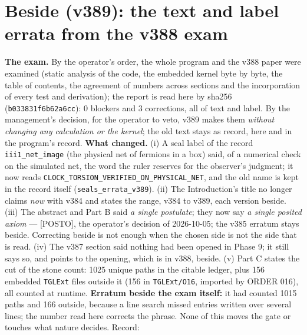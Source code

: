 \documentclass[11pt]{article}
\theoremstyle{definition}\newtheorem{deriv}{Derivation}
\begin{document}
\section*{Beside (v389): the text and label errata from the v388 exam}


\textbf{The exam.} By the operator's order, the whole program and the v388 paper were examined (static analysis of the code, the embedded kernel byte by byte, the table of contents, the agreement of numbers across sections and the incorporation of every test and derivation); the report is read here by sha256 (\texttt{b033831f6b62a6cc}): 0 blockers and 3 corrections, all of text and label. By the management's decision, for the operator to veto, v389 makes them \emph{without changing any calculation or the kernel}; the old text stays as record, here and in the program's record. \textbf{What changed.} (i) A seal label of the record \texttt{iii1\_net\_image} (the physical net of fermions in a box) said, of a numerical check on the simulated net, the word the ruler reserves for the observer's judgment; it now reads \texttt{CLOCK\_\allowbreak{}TORSION\_\allowbreak{}VERIFIED\_\allowbreak{}ON\_\allowbreak{}PHYSICAL\_\allowbreak{}NET}, and the old name is kept in the record itself (\texttt{seals\_errata\_v389}). (ii) The Introduction's title no longer claims \emph{now} with v384 and states the range, v384 to v389, each version beside. (iii) The abstract and Part B said \emph{a single postulate}; they now say \emph{a single posited axiom} --- \textsf{[POSTO]}, the operator's decision of 2026-10-05; the v385 erratum stays beside. Correcting beside is not enough when the chosen side is not the side that is read. (iv) The v387 section said nothing had been opened in Phase 9; it still says so, and points to the opening, which is in v388, beside. (v) Part C states the cut of the stone count: 1025 unique paths in the citable ledger, plus 156 embedded \texttt{TGLExt} files outside it (156 in \texttt{TGLExt/O16}, imported by ORDER 016), all counted at runtime. \textbf{Erratum beside the exam itself:} it had counted 1015 paths and 166 outside, because a line search missed entries written over several lines; the number read here corrects the phrase. None of this moves the gate or touches what nature decides. Record: 
\end{document}
